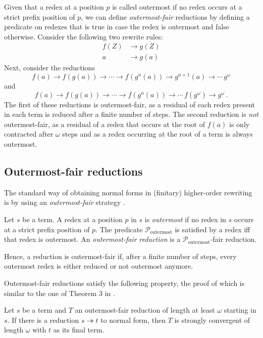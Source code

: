 \documentclass{LMCS}
\theoremstyle{definition}
\newcommand{\rew}{\rightarrow}
\newcommand{\trewt}{\twoheadrightarrow}
\newcommand{\Parg}[1]{\mathcal{P}_{\mathrm{#1}}\xspace}
\newcommand{\Poutermost}[0]{\Parg{outermost}}
\begin{document}
\begin{exa}
\label{ex:outfair}
Given that a redex at a position $p$ is called outermost if no redex occurs at a strict prefix position of $p$, we can define \emph{outermost-fair} reductions by defining a predicate on redexes that is true in case the redex is outermost and false otherwise. Consider the following two rewrite rules:
\begin{align*}
f(Z) & \rew g(Z) \\
a    & \rew g(a)
\end{align*}
Next, consider the reductions
\[
f(a) \rew f(g(a)) \rew \cdots \rew f(g^n(a)) \rew g^{n + 1}(a) \rew \cdots \, g^\omega
\]
and
\[
f(a) \rew f(g(a)) \rew \cdots \rew f(g^n(a)) \rew \cdots \, f(g^\omega) \rew g^\omega \, .
\]
The first of these reductions is outermost-fair, as a residual of each redex present in each term is reduced after a finite number of steps. The second reduction is \emph{not} outermost-fair, as a residual of a redex that occurs at the root of $f(a)$ is only contracted after $\omega$ steps and as a redex occurring at the root of a term is always outermost.
\end{exa}

\subsection{Outermost-fair reductions}
\label{sec:outfair}

The standard way of obtaining normal forms in (finitary)
higher-order rewriting is by using an \emph{outermost-fair} strategy
\cite{OD77,R97,O99}. 

\begin{defi}
Let $s$ be a term. A redex at a position $p$ in $s$ is \emph{outermost} if no redex in $s$ occurs at a strict prefix position of $p$. 
The predicate $\Poutermost$ is satisfied by a redex if{f} that redex is outermost.
 An \emph{outermost-fair reduction} is a $\Poutermost$-fair reduction.
\end{defi}

Hence, a reduction is outermost-fair if, after a finite number of steps, every outermost redex is either reduced or not outermost anymore.

Outermost-fair reductions satisfy the following property, the proof of which is similar to the one of Theorem 3 in \cite{O99}.
\begin{lem}
\label{lem:outermost_help}
Let $s$ be a term and $T$ an outermost-fair reduction of length at least $\omega$ starting in $s$. If there is a reduction $s \trewt t$ to normal form, then $T$ is strongly convergent of length $\omega$ with $t$ as its final term.
\end{lem}
\end{document}
